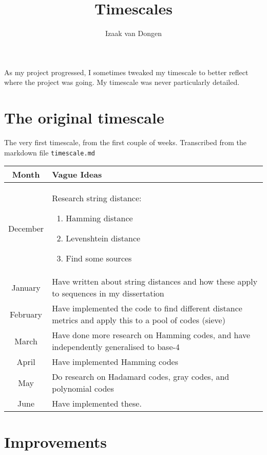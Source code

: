 \documentclass[a4paper,11pt]{article}
\title{Timescales}
\author{Izaak van Dongen}
\begin{document}
    \maketitle

    As my project progressed, I sometimes tweaked my timescale to better reflect
    where the project was going. My timescale was never particularly detailed.

    \section{The original timescale}
    The very first timescale, from the first couple of weeks. Transcribed from
    the markdown file \texttt{timescale.md}

    \begin{center}
    {
    \renewcommand{\arraystretch}{1.3}
    \begin{longtable}{c p{}}
    \toprule
    Month & Vague Ideas \\
    \midrule
    December &
    Research string distance:
    \begin{enumerate}
        \item Hamming distance
        \item Levenshtein distance
        \item Find some sources
    \end{enumerate}\\
    January &
    Have written about string distances and how these apply to sequences in my
    dissertation \\
    February &
    Have implemented the code to find different distance metrics and apply this
    to a pool of codes (sieve) \\
    March &
    Have done more research on Hamming codes, and have independently generalised
    to base-4 \\
    April &
    Have implemented Hamming codes \\
    May &
    Do research on Hadamard codes, gray codes, and polynomial codes \\
    June &
    Have implemented these. \\
    \bottomrule
    \end{longtable}
    }
    \end{center}

    \section{Improvements}
\end{document}

